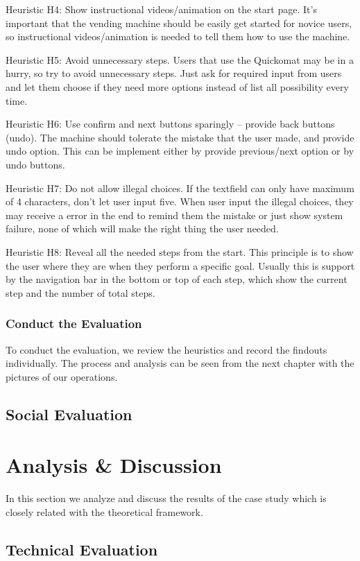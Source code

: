 \documentclass[twocolumn]{article}
\begin{document}
Heuristic H4: Show instructional videos/animation on the start page. It’s important that the vending machine should be easily get started for novice users, so instructional videos/animation is needed to tell them how to use the machine.

Heuristic H5: Avoid unnecessary steps. Users that use the Quickomat may be in a hurry, so try to avoid unnecessary steps. Just ask for required input from users and let them choose if they need more options instead of list all possibility every time.

Heuristic H6: Use confirm and next buttons sparingly -- provide back buttons (undo). The machine should tolerate the mistake that the user made, and provide undo option. This can be implement either by provide previous/next option or by undo buttons.

Heuristic H7: Do not allow illegal choices. If the textfield can only have maximum of 4 characters, don’t let user input five. When user input the illegal choices, they may receive a error in the end to remind them the mistake or just show system failure, none of which will make the right thing the user needed.

Heuristic H8: Reveal all the needed steps from the start. This principle is to show the user where they are when they perform a specific goal. Usually this is support by the navigation bar in the bottom or top of each step, which show the current step and the number of total steps.

\subsubsection{Conduct the Evaluation}
To conduct the evaluation, we review the heuristics and record the findouts individually. The process and analysis can be seen from the next chapter with the pictures of our operations.

\subsection{Social Evaluation}

\section{Analysis \& Discussion}
In this section we analyze and discuss the results of the case study which is closely related with the theoretical framework.

\subsection{Technical Evaluation}
\end{document}

